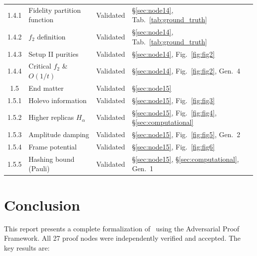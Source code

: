 \documentclass[11pt,a4paper]{article}
\begin{document}
\begin{table}[H]
\begin{tabular}{clcl}
1.4.1   & Fidelity partition function     & Validated & \S\ref{sec:node14}, Tab.~\ref{tab:ground_truth} \\
1.4.2   & $f_2$ definition                & Validated & \S\ref{sec:node14}, Tab.~\ref{tab:ground_truth} \\
1.4.3   & Setup II purities               & Validated & \S\ref{sec:node14}, Fig.~\ref{fig:fig2} \\
1.4.4   & Critical $f_2$ \& $O(1/t)$      & Validated & \S\ref{sec:node14}, Fig.~\ref{fig:fig2}, Gen.~4 \\
\midrule
1.5     & End matter                      & Validated & \S\ref{sec:node15} \\
1.5.1   & Holevo information              & Validated & \S\ref{sec:node15}, Fig.~\ref{fig:fig3} \\
1.5.2   & Higher replicas $H_\alpha$      & Validated & \S\ref{sec:node15}, Fig.~\ref{fig:fig4}, \S\ref{sec:computational} \\
1.5.3   & Amplitude damping               & Validated & \S\ref{sec:node15}, Fig.~\ref{fig:fig5}, Gen.~2 \\
1.5.4   & Frame potential                 & Validated & \S\ref{sec:node15}, Fig.~\ref{fig:fig6} \\
1.5.5   & Hashing bound (Pauli)           & Validated & \S\ref{sec:node15}, \S\ref{sec:computational}, Gen.~1 \\
\bottomrule
\end{tabular}
\end{table}

\section{Conclusion}

This report presents a complete formalization of~\cite{Sauliere2026} using the Adversarial Proof Framework. All 27 proof nodes were independently verified and accepted. The key results are:
\end{document}
